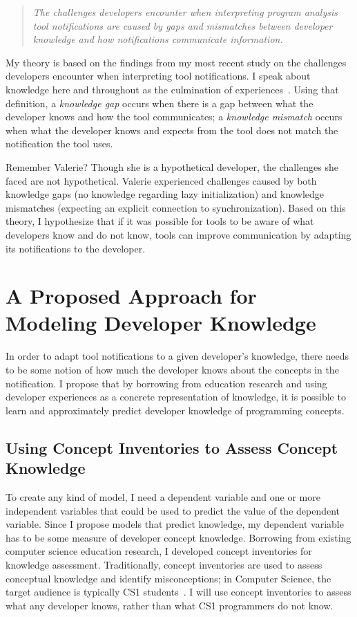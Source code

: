\documentclass{llncs}
\begin{document}
\begin{quotation}
	\noindent
	\emph{The challenges developers encounter when interpreting program analysis tool notifications are caused by gaps and mismatches between developer knowledge and how notifications communicate information.}
\end{quotation}

My theory is based on the findings from my most recent study on the challenges developers encounter when interpreting tool notifications. 
I speak about knowledge here and throughout as the culmination of experiences~\cite{johnson1989mental,argote2011organizational}.
Using that definition, a \emph{knowledge gap} occurs when there is a gap between what the developer knows and how the tool communicates; a \emph{knowledge mismatch} occurs when what the developer knows and expects from the tool does not match the notification the tool uses.

Remember Valerie? Though she is a hypothetical developer, the challenges she faced are not hypothetical. Valerie experienced challenges caused by both knowledge gaps (no knowledge regarding lazy initialization) and knowledge mismatches (expecting an explicit connection to synchronization). Based on this theory, I hypothesize that if it was possible for tools to be aware of what developers know and do not know, tools can improve communication by adapting its notifications to the developer.

\section{A Proposed Approach for Modeling Developer Knowledge}
In order to adapt tool notifications to a given developer's knowledge, there needs to be some notion of how much the developer knows about the concepts in the notification. I propose that by borrowing from education research and using developer experiences as a concrete representation of knowledge, it is possible to learn and approximately predict developer knowledge of programming concepts.

\subsection{Using Concept Inventories to Assess Concept Knowledge}
To create any kind of model, I need a dependent variable and one or more independent variables that could be used to predict the value of the dependent variable. Since I propose models that predict knowledge, my dependent variable has to be some measure of developer concept knowledge.
Borrowing from existing computer science education research, I developed concept inventories for knowledge assessment. Traditionally, concept inventories are used to  assess conceptual knowledge and identify misconceptions; in Computer Science, the target audience is typically CS1 students~\cite{tew2010developing,kaczmarczyk2010identifying}. I will use concept inventories to assess what any developer knows, rather than what CS1 programmers do not know.
\end{document}
